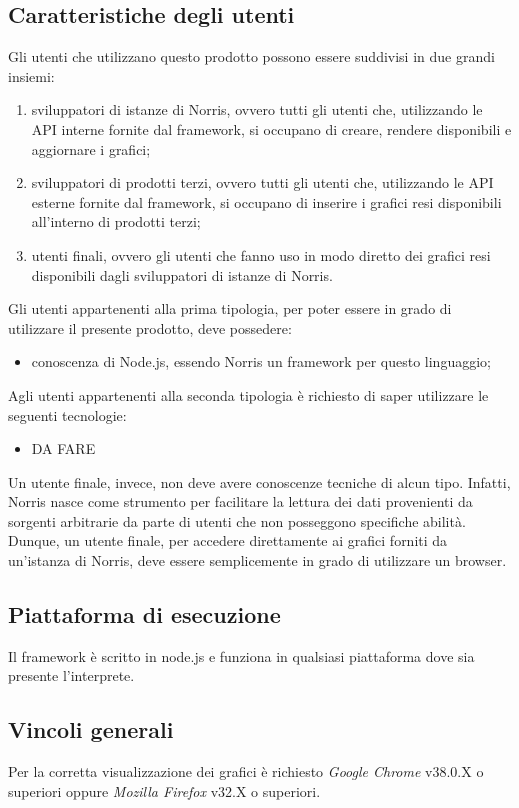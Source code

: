 	\subsection{Caratteristiche degli utenti}
		Gli utenti che utilizzano questo prodotto possono essere suddivisi in due grandi insiemi:
		\begin{enumerate}
			\item sviluppatori di istanze di Norris, ovvero tutti gli utenti che, utilizzando le API interne fornite dal framework, si occupano di creare, rendere disponibili e aggiornare i grafici;
			\item sviluppatori di prodotti terzi, ovvero tutti gli utenti che, utilizzando le API esterne fornite dal framework, si occupano di inserire i grafici resi disponibili all'interno di prodotti terzi;
			\item utenti finali, ovvero gli utenti che fanno uso in modo diretto dei grafici resi disponibili dagli sviluppatori di istanze di Norris.
		\end{enumerate}
		Gli utenti appartenenti alla prima tipologia, per poter essere in grado di utilizzare il presente prodotto, deve possedere:
		\begin{itemize}
			\item conoscenza di Node.js, essendo Norris un framework per questo linguaggio;
		\end{itemize}
		Agli utenti appartenenti alla seconda tipologia è richiesto di saper utilizzare le seguenti tecnologie:
		\begin{itemize}
			\item DA FARE
		\end{itemize}
		Un utente finale, invece, non deve avere conoscenze tecniche di alcun tipo. Infatti, Norris nasce come strumento per facilitare la lettura dei dati provenienti da sorgenti arbitrarie da parte di utenti che non posseggono specifiche abilità. Dunque, un utente finale, per accedere direttamente ai grafici forniti da un'istanza di Norris, deve essere semplicemente in grado di utilizzare un browser.\\
	\subsection{Piattaforma di esecuzione}
		Il framework è scritto in node.js e funziona in qualsiasi piattaforma dove sia presente l'interprete.
	\subsection{Vincoli generali}
		Per la corretta visualizzazione dei grafici è richiesto \emph{Google Chrome} v38.0.X o superiori oppure \emph{Mozilla Firefox} v32.X o superiori.
